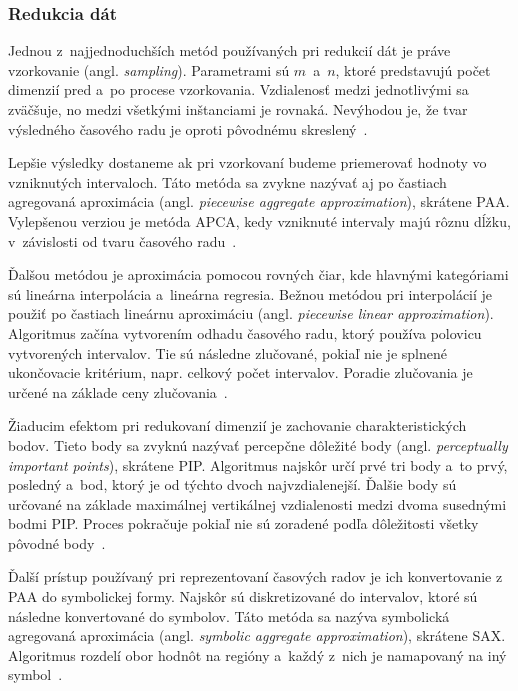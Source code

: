 \documentclass[a4paper,twoside,slovak,12pt,appendix]{article}
\begin{document}
\subsubsection{Redukcia dát}
Jednou z~najjednoduchších metód používaných pri redukcií dát je práve
vzorkovanie (angl. \textit{sampling}). Parametrami sú $m$~a~$n$, ktoré
predstavujú počet dimenzií pred a~po procese vzorkovania. Vzdialenosť medzi
jednotlivými sa zväčšuje, no medzi všetkými inštanciami je rovnaká. Nevýhodou
je, že tvar výsledného časového radu je oproti pôvodnému skreslený~\cite{Fu2011}.

Lepšie výsledky dostaneme ak pri vzorkovaní budeme priemerovať hodnoty vo
vzniknutých intervaloch. Táto metóda sa zvykne nazývať aj po častiach agregovaná
aproximácia (angl. \textit{piecewise aggregate approximation}), skrátene PAA.
Vylepšenou verziou je metóda APCA, kedy vzniknuté intervaly majú rôznu dĺžku,
	v~závislosti od tvaru časového radu~\cite{Keogh2002}.

Ďalšou metódou je aproximácia pomocou rovných čiar, kde hlavnými kategóriami sú
lineárna interpolácia a~lineárna regresia. Bežnou metódou pri interpolácií je
použiť po častiach lineárnu aproximáciu (angl. \textit{piecewise linear
approximation}). Algoritmus začína vytvorením odhadu časového radu, ktorý
používa polovicu vytvorených intervalov. Tie sú následne zlučované, pokiaľ nie
je splnené ukončovacie kritérium, napr. celkový počet intervalov. Poradie
zlučovania je určené na základe ceny zlučovania~\cite{Fu2011}.

Žiaducim efektom pri redukovaní dimenzií je zachovanie charakteristických bodov.
Tieto body sa zvyknú nazývať percepčne dôležité body (angl. \textit{perceptually
important points}), skrátene PIP. Algoritmus najskôr určí prvé tri body a~to
prvý, posledný a~bod, ktorý je od týchto dvoch najvzdialenejší. Ďalšie body sú
určované na základe maximálnej vertikálnej vzdialenosti medzi dvoma susednými
bodmi PIP. Proces pokračuje pokiaľ nie sú zoradené podľa dôležitosti všetky
pôvodné body~\cite{Fu2011}.

Ďalší prístup používaný pri reprezentovaní časových radov je ich konvertovanie
z PAA do symbolickej formy. Najskôr sú diskretizované do intervalov, ktoré sú
následne konvertované do symbolov. Táto metóda sa nazýva symbolická agregovaná
aproximácia (angl. \textit{symbolic aggregate approximation}), skrátene SAX.
Algoritmus rozdelí obor hodnôt na regióny a~každý z~nich je namapovaný na iný
symbol~\cite{Fu2011}.
\end{document}
